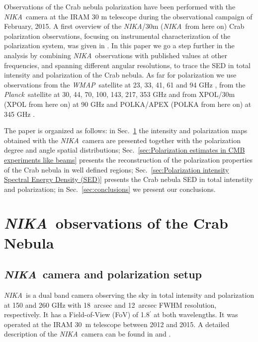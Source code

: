 \documentclass[twocolumn,traditabstract]{aa}
\def\NIKA{\textit{NIKA}}
\def\Planck{\textit{Planck}}
\def\WMAP{\textit{WMAP}}
\begin{document}
Observations of the Crab nebula polarization have been performed with the
\NIKA\ camera \citep{monfardini2010,catalano2014,monfardini2014} at the IRAM 30
m telescope during the observational campaign of February, 2015. A first
overview of the \NIKA/30m (\NIKA\ from here on) Crab polarization observations,
focusing on instrumental characterization of the polarization system, was given in
\cite{2016JLTP..184..724R}. In this paper we go a step further in the analysis
by combining \NIKA\ observations with published values at other frequencies, and spanning different angular resolutions, to trace the
SED in total intensity and polarization of the Crab nebula. As far for polarization we use observations from the \WMAP\
satellite at 23, 33, 41, 61 and 94 GHz \citep{2011ApJS..192...19W}, from the
\Planck\ satellite at 30, 44, 70, 100, 143, 217, 353 GHz and from XPOL/30m (XPOL from here on) at 90 GHz
\citep{aumont2010} and POLKA/APEX (POLKA from here on) at 345 GHz \citep{2014PASP..126.1027W}. 

The paper is organized as follows: in Sec.~\ref{sec:NIKA observations} the
intensity and polarization maps obtained with the \NIKA\ camera are presented
together with the polarization degree and angle spatial distributions;
Sec.~\ref{sec:Polarization estimates in CMB experiments like beams} presents the
reconstruction of the polarization properties of the Crab nebula in well defined
regions; Sec.~\ref{sec:Polarization intensity Spectral Energy Density (SED)}
presents the Crab nebula SED in total intenstity and polarization; in
Sec.~\ref{sec:conclusions} we present our conclusions.
 
\section{\NIKA\ observations of the Crab Nebula}\label{sec:NIKA observations}
\subsection{\NIKA\ camera and polarization setup}\label{sec:nika camera}
\NIKA\ is a dual band camera observing the sky in total intensity and polarization at
150 and 260 GHz with 18~arcsec and 12~arcsec FWHM resolution, respectively. It
has a Field-of-View (FoV) of 1.8$^{\prime}$ at both wavelengths. It was operated at the
IRAM 30~m telescope between 2012 and 2015. A detailed description of the
\NIKA\ camera can be found in \citet{monfardini2010, monfardini2011} and
\citet{catalano2014}.
\end{document}
